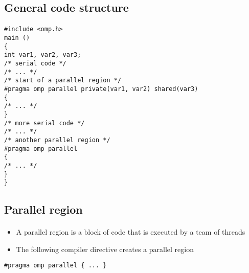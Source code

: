 \documentclass[%
oneside,                 %
final,                   %
10pt]{article}
\begin{document}
\noindent
\subsection*{General code structure}

\paragraph{}




















\begin{verbatim}
#include <omp.h>
main ()
{
int var1, var2, var3;
/* serial code */
/* ... */
/* start of a parallel region */
#pragma omp parallel private(var1, var2) shared(var3)
{
/* ... */
}
/* more serial code */
/* ... */
/* another parallel region */
#pragma omp parallel
{
/* ... */
}
}

\end{verbatim}



\subsection*{Parallel region}

\paragraph{}
\begin{itemize}
\item A parallel region is a block of code that is executed by a team of threads

\item The following compiler directive creates a parallel region
\end{itemize}

\noindent


\begin{verbatim}
#pragma omp parallel { ... }

\end{verbatim}
\end{document}
